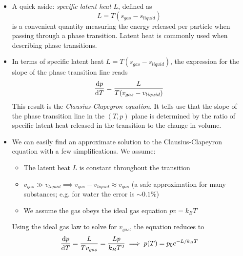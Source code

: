 \documentclass[11pt, a4paper]{article}
\begin{document}
\begin{itemize}
	\item A quick aside: \textit{specific latent heat} $ L $, defined as
	\begin{equation*}
		L = T(s_{gas} - s_{liquid})
	\end{equation*}
	is a convenient quantity measuring the energy released per particle when passing through a phase transition. Latent heat is commonly used when describing phase transitions.
	
	\item In terms of specific latent heat $ L = T(s_{gas} - s_{liquid}) $, the expression for the slope of the phase transition line reads
	\begin{equation*}
		\dv{p}{T} = \frac{L}{T(v_{gas} - v_{liquid})}
	\end{equation*}
	This result is the \textit{Clausius-Clapeyron equation}. It tells use that the slope of the phase transition line in the $ (T, p) $ plane is determined by the ratio of specific latent heat released in the transition to the change in volume.
	
	\item We can easily find an approximate solution to the Clausius-Clapeyron equation with a few simplifications. We assume:
	\begin{itemize}
		\item The latent heat $ L $ is constant throughout the transition
		\item $ v_{gas} \gg v_{liquid} \implies v_{gas} - v_{liquid} \approx v_{gas}$ (a safe approximation for many substances; e.g. for water the error is $ \sim 0.1 \% $)
		\item We assume the gas obeys the ideal gas equation $ pv = k_{B}T $
	\end{itemize}
	Using the ideal gas law to solve for $ v_{gas} $, the equation reduces to
	\begin{equation*}
		\dv{p}{T} = \frac{L}{Tv_{gas}} = \frac{Lp}{k_{B}T^{2}} \implies p(T) = p_{0} e^{-L/k_{B}T}
	\end{equation*}
\end{itemize}
\end{document}
